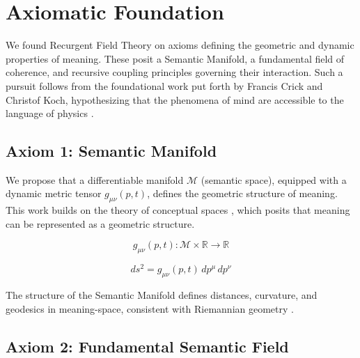 \chapter{Axiomatic Foundation}
\label{1:axiomatic_foundation}

We found Recurgent Field Theory on axioms defining the geometric and dynamic properties of meaning. These posit a Semantic Manifold, a fundamental field of coherence, and recursive coupling principles governing their interaction. Such a pursuit follows from the foundational work put forth by Francis Crick and Christof Koch, hypothesizing that the phenomena of mind are accessible to the language of physics \autocite{Crick1990, KochConsciousness2019}.


\section{Axiom 1: Semantic Manifold}
\label{1.1:axiom_1_semantic_manifold}

We propose that a differentiable manifold \(\mathcal{M}\) (semantic space), equipped with a dynamic metric tensor \(g_{\mu\nu}(p,t)\), defines the geometric structure of meaning. This work builds on the theory of conceptual spaces \autocite{Gardenfors2000}, which posits that meaning can be represented as a geometric structure.

\begin{equation}
g_{\mu\nu}(p,t) : \mathcal{M} \times \mathbb{R} \rightarrow \mathbb{R}
\end{equation}

\begin{equation}
ds^2 = g_{\mu\nu}(p,t) \, dp^\mu \, dp^\nu
\end{equation}

The structure of the Semantic Manifold defines distances, curvature, and geodesics in meaning-space, consistent with Riemannian geometry \autocite{Riemann1868}.


\section{Axiom 2: Fundamental Semantic Field}
\label{1.2:axiom_2_fundamental_semantic_field}

